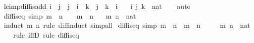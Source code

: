 \begin{isabellebody}
\endisatagproof
{\isafoldproof}%
%
\isadelimproof
\isanewline
%
\endisadelimproof
\isanewline
{}\isamarkupfalse%
\ le{\isacharunderscore}{\kern0pt}imp{\isacharunderscore}{\kern0pt}diff{\isacharunderscore}{\kern0pt}is{\isacharunderscore}{\kern0pt}add{\isacharcolon}{\kern0pt}\ {\isachardoublequoteopen}i\ {\isasymle}\ j\ {\isasymLongrightarrow}\ {\isacharparenleft}{\kern0pt}j\ {\isacharminus}{\kern0pt}\ i\ {\isacharequal}{\kern0pt}\ k{\isacharparenright}{\kern0pt}\ {\isacharequal}{\kern0pt}\ {\isacharparenleft}{\kern0pt}j\ {\isacharequal}{\kern0pt}\ k\ {\isacharplus}{\kern0pt}\ i{\isacharparenright}{\kern0pt}{\isachardoublequoteclose}\isanewline
\ \ \ i\ j\ k\ {\isacharcolon}{\kern0pt}{\isacharcolon}{\kern0pt}\ nat\isanewline
%
\isadelimproof
\ \ %
\endisadelimproof
%
\isatagproof
{}\isamarkupfalse%
\ auto%
\endisatagproof
{\isafoldproof}%
%
\isadelimproof
\isanewline
%
\endisadelimproof
\isanewline
{}\isamarkupfalse%
\ diff{\isacharunderscore}{\kern0pt}is{\isacharunderscore}{\kern0pt}{}{\isacharunderscore}{\kern0pt}eq\ {\isacharbrackleft}{\kern0pt}simp{\isacharbrackright}{\kern0pt}{\isacharcolon}{\kern0pt}\ {\isachardoublequoteopen}m\ {\isacharminus}{\kern0pt}\ n\ {\isacharequal}{\kern0pt}\ {}\ {\isasymlongleftrightarrow}\ m\ {\isasymle}\ n{\isachardoublequoteclose}\isanewline
\ \ \ m\ n\ {\isacharcolon}{\kern0pt}{\isacharcolon}{\kern0pt}\ nat\isanewline
%
\isadelimproof
\ \ %
\endisadelimproof
%
\isatagproof
{}\isamarkupfalse%
\ {\isacharparenleft}{\kern0pt}induct\ m\ n\ rule{\isacharcolon}{\kern0pt}\ diff{\isacharunderscore}{\kern0pt}induct{\isacharparenright}{\kern0pt}\ simp{\isacharunderscore}{\kern0pt}all%
\endisatagproof
{\isafoldproof}%
%
\isadelimproof
\isanewline
%
\endisadelimproof
\isanewline
{}\isamarkupfalse%
\ diff{\isacharunderscore}{\kern0pt}is{\isacharunderscore}{\kern0pt}{}{\isacharunderscore}{\kern0pt}eq{\isacharprime}{\kern0pt}\ {\isacharbrackleft}{\kern0pt}simp{\isacharbrackright}{\kern0pt}{\isacharcolon}{\kern0pt}\ {\isachardoublequoteopen}m\ {\isasymle}\ n\ {\isasymLongrightarrow}\ m\ {\isacharminus}{\kern0pt}\ n\ {\isacharequal}{\kern0pt}\ {}{\isachardoublequoteclose}\isanewline
\ \ \ m\ n\ {\isacharcolon}{\kern0pt}{\isacharcolon}{\kern0pt}\ nat\isanewline
%
\isadelimproof
\ \ %
\endisadelimproof
%
\isatagproof
{}\isamarkupfalse%
\ {\isacharparenleft}{\kern0pt}rule\ iffD{}{\isacharcomma}{\kern0pt}\ rule\ diff{\isacharunderscore}{\kern0pt}is{\isacharunderscore}{\kern0pt}{}{\isacharunderscore}{\kern0pt}eq{\isacharparenright}{\kern0pt}%

\end{isabellebody}
